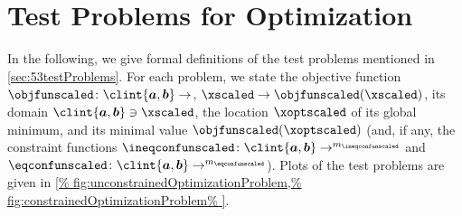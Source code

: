 \chapter{Test Problems for Optimization}
\label{chap:a20testProblems}

In the following, we give formal definitions of the test problems
mentioned in \cref{sec:53testProblems}.
For each problem, we state the objective function
$\objfunscaled\colon \clint{\*a, \*b} \to \real$,
$\xscaled \to \objfunscaled(\xscaled)$,
its domain $\clint{\*a, \*b} \ni \xscaled$,
the location $\xoptscaled$ of its global minimum, and
its minimal value $\objfunscaled(\xoptscaled)$
(and, if any, the constraint functions
$\ineqconfunscaled\colon \clint{\*a, \*b} \to \real^{m_{\ineqconfunscaled}}$
and $\eqconfunscaled\colon \clint{\*a, \*b} \to \real^{m_{\eqconfunscaled}}$).
Plots of the test problems are given in
\cref{%
  fig:unconstrainedOptimizationProblem,%
  fig:constrainedOptimizationProblem%
}.

{
  \newcommand*{\centertestfunline}[1]{%
    \mathclap{\hphantom{\mathrm{(B.99a)}}#1}%
  }
  
  
  
}

\cleardoublepage
